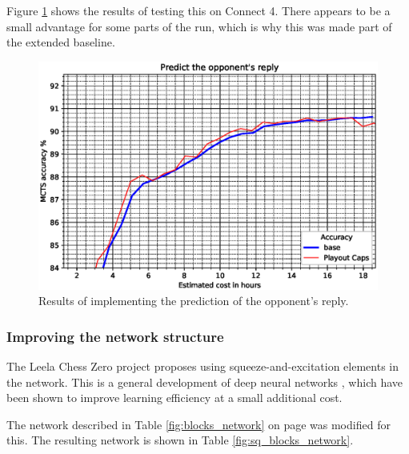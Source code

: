 \documentclass[12pt,onecolumn,oneside,titlepage]{article}
\begin{document}
Figure \ref{fig:predict_reply} shows the results of testing this on Connect 4. There appears to be a small advantage for some parts of the run, which is why this was made part of the extended baseline.

\begin{figure}[H]
\centering
\includegraphics[clip,width=\columnwidth]{predict_reply}
\caption{Results of implementing the prediction of the opponent's reply.}
\label{fig:predict_reply}
\end{figure}


\subsubsection{Improving the network structure}

The Leela Chess Zero project \cite{leela0sq} proposes using squeeze-and-excitation elements in the network.
This is a general development of deep neural networks  \cite{hu2018squeeze}, which have been shown to improve learning efficiency at a small additional cost.

The network described in Table \ref{fig:blocks_network} on page \pageref{fig:blocks_network} was modified for this. The resulting network is shown in Table \ref{fig:sq_blocks_network}.
\end{document}
